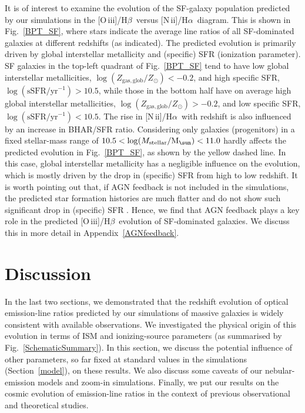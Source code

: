 \documentclass[fleqn,usenatbib]{mnras}
\newcommand{\Msun}{\hbox{M$_\sun$}}
\newcommand{\oiiihb}{\hbox{[O\,{\sc iii}]/H$\beta$}}
\newcommand{\niiha}{\hbox{[N\,{\sc ii}]/H$\alpha$}}
\begin{document}
It is of interest to examine the evolution of the SF-galaxy population
predicted by our simulations in the \oiiihb\ versus \niiha\
diagram. This is shown in Fig.~\ref{BPT_SF}, where stars indicate the
average line ratios of all SF-dominated galaxies at different
redshifts (as indicated). The predicted evolution is primarily driven
by global interstellar metallicity and (specific) SFR (ionization
parameter).  SF galaxies in the top-left quadrant of Fig.~\ref{BPT_SF}
tend to have low global interstellar metallicities,
$\log(Z_\mathrm{gas,glob}/Z_\odot)<-0.2$, and high specific SFR,
$\log(\mathrm{sSFR/yr^{-1}})>10.5$, while those in the bottom half
have on average high global interstellar metallicities,
$\log(Z_\mathrm{gas,glob}/Z_\odot)>-0.2$, and  low specific SFR,
$\log(\mathrm{sSFR/yr^{-1}})<10.5$. The rise in \niiha\ with  redshift
is also influenced by an increase in BHAR/SFR ratio. Considering only
galaxies (progenitors) in a fixed stellar-mass range of $10.5<\log
(M_{\rm stellar}/\Msun)<11.0$ hardly affects the predicted evolution
in Fig.~\ref{BPT_SF}, as shown by the yellow dashed line. In this
case, global interstellar metallicity has a negligible influence on
the evolution,  which is mostly driven by the drop in (specific) SFR
from high to low redshift. It is worth pointing out that, if AGN
feedback is not included in the simulations,  the predicted star
formation histories are much flatter and do not show such significant
drop in (specific) SFR \citep[see][]{Choi16}. Hence, we find that AGN
feedback plays a key role  in the predicted \oiiihb\ evolution of
SF-dominated galaxies. We discuss this in more detail in
Appendix~\ref{AGNfeedback}. 

\section{Discussion}\label{discussion} 

In the last two sections, we demonstrated that the redshift evolution 
of optical emission-line ratios predicted by our simulations of
massive galaxies is widely consistent with available observations. We
investigated the physical origin of this evolution in terms of ISM and
ionizing-source parameters (as summarised by Fig.~\ref{SchematicSummary}). 
In this section, we discuss the potential influence
of other parameters, so far fixed at standard values in the
simulations (Section~\ref{model}), on these results. We also discuss
some caveats of our nebular-emission models and zoom-in
simulations. Finally, we put our results on the cosmic evolution of
emission-line ratios in the context of previous observational and
theoretical studies.    
\end{document}
